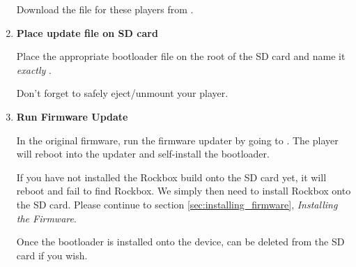 \begin{enumerate}
Download the  file for these players from .



\item \textbf{Place update file on SD card}

Place the appropriate bootloader file on the root of the SD card and name it
\emph{exactly} .

Don't forget to safely eject/unmount your player.

\item \textbf{Run Firmware Update}

In the original firmware, run the firmware updater by going to
. The player will reboot into the updater and self-install
the bootloader.

If you have not installed the Rockbox build onto the SD card yet, it will reboot and fail
to find Rockbox. We simply then need to install Rockbox onto the SD card. Please continue to
section \ref{sec:installing_firmware}, \textit{Installing the Firmware}.

Once the bootloader is installed onto the device,  can be deleted from the SD card if you wish.
\end{enumerate}
